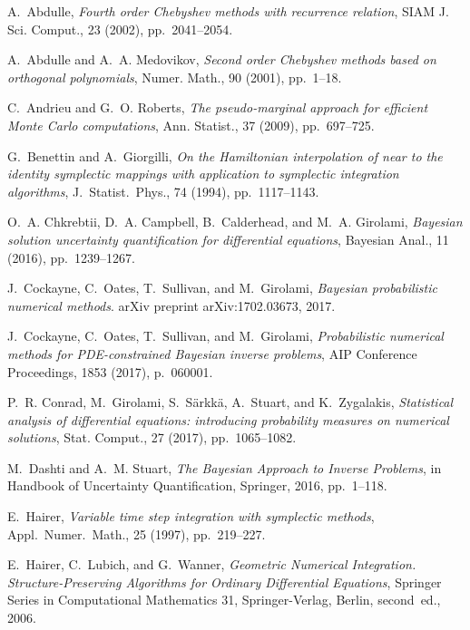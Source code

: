 \documentclass[10pt]{article}
\begin{document}
\def\cprime{$'$}
\begin{thebibliography}{10}
	
	{\sc A.~Abdulle}, {\em Fourth order {C}hebyshev methods with recurrence
		relation}, SIAM J. Sci. Comput., 23 (2002), pp.~2041--2054.
	
	{\sc A.~Abdulle and A.~A. Medovikov}, {\em Second order {C}hebyshev methods
		based on orthogonal polynomials}, Numer. Math., 90 (2001), pp.~1--18.
	
	{\sc C.~Andrieu and G.~O. Roberts}, {\em The pseudo-marginal approach for
		efficient {M}onte {C}arlo computations}, Ann. Statist., 37 (2009),
	pp.~697--725.
	
	{\sc G.~Benettin and A.~Giorgilli}, {\em On the {H}amiltonian interpolation of
		near to the identity symplectic mappings with application to symplectic
		integration algorithms}, J.\ Statist.\ Phys., 74 (1994), pp.~1117--1143.
	
	{\sc O.~A. Chkrebtii, D.~A. Campbell, B.~Calderhead, and M.~A. Girolami}, {\em
		Bayesian solution uncertainty quantification for differential equations},
	Bayesian Anal., 11 (2016), pp.~1239--1267.
	
	{\sc J.~Cockayne, C.~Oates, T.~Sullivan, and M.~Girolami}, {\em Bayesian
		probabilistic numerical methods}.
	\newblock arXiv preprint arXiv:1702.03673, 2017.
	
	{\sc J.~Cockayne, C.~Oates, T.~Sullivan, and M.~Girolami}, {\em Probabilistic
		numerical methods for {PDE}-constrained {B}ayesian inverse problems}, AIP
	Conference Proceedings, 1853 (2017), p.~060001.
	
	{\sc P.~R. Conrad, M.~Girolami, S.~S\"{a}rkk\"{a}, A.~Stuart, and
		K.~Zygalakis}, {\em Statistical analysis of differential equations:
		introducing probability measures on numerical solutions}, Stat. Comput., 27
	(2017), pp.~1065--1082.
	
	{\sc M.~Dashti and A.~M. Stuart}, {\em The {B}ayesian {A}pproach to {I}nverse
		{P}roblems}, in Handbook of Uncertainty Quantification, Springer, 2016,
	pp.~1--118.
	
	{\sc E.~Hairer}, {\em Variable time step integration with symplectic methods},
	Appl.\ Numer.\ Math., 25 (1997), pp.~219--227.
	
	{\sc E.~Hairer, C.~Lubich, and G.~Wanner}, {\em Geometric Numerical
		Integration. Structure-Preserving Algorithms for Ordinary Differential
		Equations}, Springer Series in Computational Mathematics 31, Springer-Verlag,
	Berlin, second~ed., 2006.
	

\end{thebibliography}
\end{document}
